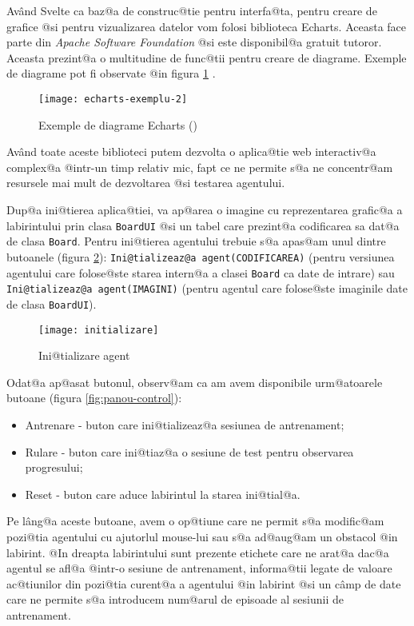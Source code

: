 Av\^ and Svelte ca baz@a de construc@tie pentru interfa@ta, pentru creare de grafice @si pentru vizualizarea datelor vom folosi biblioteca Echarts. Aceasta face parte din \textsl{Apache Software Foundation} @si este disponibil@a gratuit tutoror. Aceasta prezint@a o multitudine de func@tii pentru creare de diagrame. Exemple de diagrame pot fi observate @in figura \ref{fig:echarts-exemplu-2} .

\begin{figure}[h]
	\centering
	\texttt{[image: echarts-exemplu-2]}
	\caption{Exemple de diagrame Echarts (\cite{diagrame-exemplu})}
	\label{fig:echarts-exemplu-2}
\end{figure}

Av\^and toate aceste biblioteci putem dezvolta o aplica@tie web interactiv@a complex@a @intr-un timp relativ mic, fapt ce ne permite s@a ne concentr@am resursele mai mult de dezvoltarea @si testarea agentului.

Dup@a ini@tierea aplica@tiei, va ap@area o imagine cu reprezentarea grafic@a a labirintului prin clasa \texttt{BoardUI} @si un tabel care prezint@a codificarea sa dat@a de clasa \texttt{Board}. Pentru ini@tierea agentului trebuie s@a apas@am unul dintre butoanele (figura \ref{fig:initializare}): \texttt{Ini@tializeaz@a agent(CODIFICAREA)} (pentru versiunea agentului care folose@ste starea intern@a a clasei \texttt{Board} ca date de intrare) sau \texttt{Ini@tializeaz@a agent(IMAGINI)} (pentru agentul care folose@ste imaginile date de clasa \texttt{BoardUI}).

\begin{figure}[h]
	\centering
	\texttt{[image: initializare]}
	\caption{Ini@tializare agent}
	\label{fig:initializare}
\end{figure}


Odat@a ap@asat butonul, observ@am ca am avem disponibile urm@atoarele butoane (figura \ref{fig:panou-control}):
\begin{itemize}
	\item Antrenare - buton care ini@tializeaz@a sesiunea de antrenament;
	\item Rulare - buton care ini@tiaz@a o sesiune de test pentru observarea progresului;
	\item Reset - buton care aduce labirintul la starea ini@tial@a.
\end{itemize}

Pe l\^ ang@a aceste butoane, avem o op@tiune care ne permit s@a modific@am pozi@tia agentului cu ajutorlul mouse-lui sau s@a ad@aug@am un obstacol @in labirint. @In dreapta labirintului sunt prezente etichete care ne arat@a dac@a agentul se afl@a @intr-o sesiune de antrenament, informa@tii legate de valoare ac@tiunilor din pozi@tia curent@a a agentului @in labirint @si un c\^ amp de date care ne permite s@a introducem num@arul de episoade al sesiunii de antrenament.

